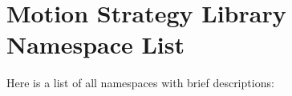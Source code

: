 \section{Motion Strategy Library Namespace List}
Here is a list of all namespaces with brief descriptions:\begin{CompactList}
\item{}
\end{CompactList}
